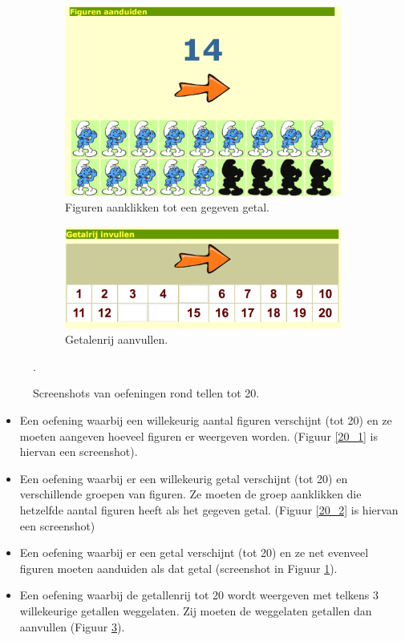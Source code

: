 \documentclass[a4paper,11pt]{article}
\theoremstyle{definition}
\begin{document}
\begin{figure}[h!]
          \begin{subfigure}{.5\textwidth}
          \centering
                \includegraphics[scale=0.15]{20_3.jpg}
                \caption{Figuren aanklikken tot een gegeven getal.}
                \label{20_3}
        \end{subfigure}%
        \begin{subfigure}{.5\textwidth}
           \centering
                \includegraphics[scale=0.15]{20_4.jpg}
                \caption{Getalenrij aanvullen.}
                \label{20_4}
        \end{subfigure}        \caption{Screenshots van oefeningen rond tellen tot 
        20.}.
\end{figure}

\begin{itemize}
  \item Een oefening waarbij een willekeurig aantal figuren verschijnt (tot 20) 
  en ze moeten aangeven hoeveel figuren er weergeven worden. (Figuur 
  \ref{20_1} is hiervan een screenshot).
  \item Een oefening waarbij er een willekeurig getal verschijnt (tot 20) en verschillende 
  groepen van figuren. Ze moeten de groep aanklikken die hetzelfde aantal 
  figuren heeft als het gegeven getal. (Figuur \ref{20_2} is hiervan een screenshot)
  \item Een oefening waarbij er een getal verschijnt (tot 20) en ze net evenveel figuren moeten aanduiden als dat getal (screenshot in Figuur \ref{20_3}).
  \item Een oefening waarbij de getallenrij tot 20 wordt weergeven met telkens 3 
  willekeurige getallen weggelaten. Zij moeten de weggelaten getallen dan aanvullen (Figuur 
  \ref{20_4}).
\end{itemize}
\end{document}

